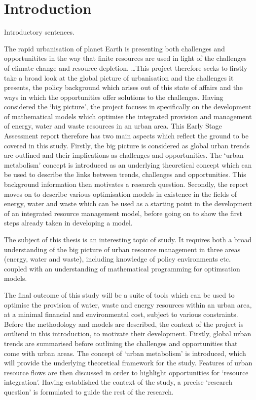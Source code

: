 \section{Introduction}
Introductory sentences.

The rapid urbanisation of planet Earth is presenting both challenges and opportunitites in the way that finite resources are used in light of the challenges of climate change and resource depletion. \ldots This project therefore seeks to firstly take a broad look at the global picture of urbanisation and the challenges it presents, the policy background which arises out of this state of affairs and the ways in which the opportunities offer solutions to the challenges. Having considered the `big picture', the project focuses in specifically on the development of mathematical models  which optimise the integrated provision and management of energy, water and waste resources in an urban area. This Early Stage Assessment report therefore has two main aspects which reflect the ground to be covered in this study. Firstly, the big picture is considered as global urban trends are outlined and their implications as challenges and opportunities. The `urban metabolism' concept is introduced as an underlying theoretical concept which can be used to describe the links between trends, challenges and opportunities. This background information then motivates a research question. Secondly, the report moves on to describe various optimisation models in existence in the fields of energy, water and waste which can be used as a starting point in the development of an integrated resource management model, before going on to show the first steps already taken in developing a model.

The subject of this thesis is an interesting topic of study. It requires both a broad understanding of the big picture of urban resource management in three areas (energy, water and waste), including knowledge of policy environments etc. coupled with an understanding of mathematical programming for optimsation models.

The final outcome of this study will be a suite of tools which can be used to optimise the provision of water, waste and energy resources within an urban area, at a minimal financial and environmental cost, subject to various constraints. Before the methodology and models are described, the context of the project is outliend in this introduction, to motivate their development. Firstly, global urban trends are summarised before outlining the challenges and opportunities that come with urban areas. The concept of `urban metabolism' is introduced, which will provide the underlying theoretical framework for the study. Features of urban resource flows are then discussed in order to highlight opportunities for `resource integration'. Having established the context of the study, a precise `research question' is formulated to guide the rest of the research.

